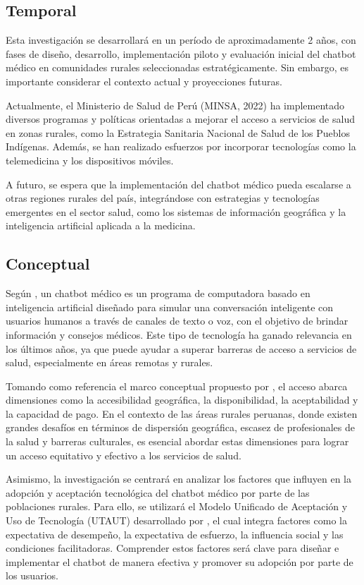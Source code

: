 \subsection{Temporal}
Esta investigación se desarrollará en un período de aproximadamente 2 años, con fases de diseño, desarrollo, implementación piloto y evaluación inicial del chatbot médico en comunidades rurales seleccionadas estratégicamente. Sin embargo, es importante considerar el contexto actual y proyecciones futuras.

Actualmente, el Ministerio de Salud de Perú (MINSA, 2022) ha implementado diversos programas y políticas orientadas a mejorar el acceso a servicios de salud en zonas rurales, como la Estrategia Sanitaria Nacional de Salud de los Pueblos Indígenas. Además, se han realizado esfuerzos por incorporar tecnologías como la telemedicina y los dispositivos móviles.

A futuro, se espera que la implementación del chatbot médico pueda escalarse a otras regiones rurales del país, integrándose con estrategias y tecnologías emergentes en el sector salud, como los sistemas de información geográfica y la inteligencia artificial aplicada a la medicina.

\subsection{Conceptual}
Según \cite{pr_Laranjo2018-gb}, un chatbot médico es un programa de computadora basado en inteligencia artificial diseñado para simular una conversación inteligente con usuarios humanos a través de canales de texto o voz, con el objetivo de brindar información y consejos médicos. Este tipo de tecnología ha ganado relevancia en los últimos años, ya que puede ayudar a superar barreras de acceso a servicios de salud, especialmente en áreas remotas y rurales.

Tomando como referencia el marco conceptual propuesto por \cite{pr_Levesque2013-vb}, el acceso abarca dimensiones como la accesibilidad geográfica, la disponibilidad, la aceptabilidad y la capacidad de pago. En el contexto de las áreas rurales peruanas, donde existen grandes desafíos en términos de dispersión geográfica, escasez de profesionales de la salud y barreras culturales, es esencial abordar estas dimensiones para lograr un acceso equitativo y efectivo a los servicios de salud.

Asimismo, la investigación se centrará en analizar los factores que influyen en la adopción y aceptación tecnológica del chatbot médico por parte de las poblaciones rurales. Para ello, se utilizará el Modelo Unificado de Aceptación y Uso de Tecnología (UTAUT) desarrollado por \cite{pr_Venkatesh2003-po}, el cual integra factores como la expectativa de desempeño, la expectativa de esfuerzo, la influencia social y las condiciones facilitadoras. Comprender estos factores será clave para diseñar e implementar el chatbot de manera efectiva y promover su adopción por parte de los usuarios.

